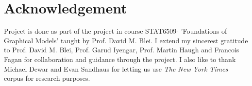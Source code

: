 \documentclass[a4paper]{article}
\begin{document}
\section*{Acknowledgement}
Project is done as part of the project in course STAT6509- 'Foundations of Graphical Models' taught by Prof. David M. Blei. 
I extend my sincerest gratitude to Prof. David M. Blei, Prof. Garud Iyengar, Prof. Martin Haugh and Francois Fagan for collaboration and guidance through the project. I also like to thank Michael Dewar and Evan Sandhaus for letting us use \emph{The New York Times} corpus for research purposes. 


{}

\end{document}
